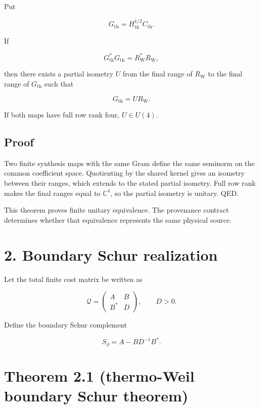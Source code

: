 Put

\[
G_{\mathrm{th}}=H_{\mathrm{th}}^{1/2}C_{\mathrm{th}}.
\]

If

\[
G_{\mathrm{th}}^*G_{\mathrm{th}}=R_{\mathrm W}^*R_{\mathrm W},
\]

then there exists a partial isometry \(U\) from the final range of \(R_{\mathrm W}\) to the final range of \(G_{\mathrm{th}}\) such that

\[
\boxed{G_{\mathrm{th}}=UR_{\mathrm W}.}
\]

If both maps have full row rank four, \(U\in U(4)\).

\hypertarget{proof}{%
\subsection{Proof}\label{proof}}

Two finite synthesis maps with the same Gram define the same seminorm on the common coefficient space. Quotienting by the shared kernel gives an isometry between their ranges, which extends to the stated partial isometry. Full row rank makes the final ranges equal to \(\mathbb C^4\), so the partial isometry is unitary. QED.

This theorem proves finite unitary equivalence. The provenance contract determines whether that equivalence represents the same physical source.

\hypertarget{boundary-schur-realization}{%
\section{2. Boundary Schur realization}\label{boundary-schur-realization}}

Let the total finite cost matrix be written as

\[
\mathcal Q=
\begin{pmatrix}
A&B\\
B^*&D
\end{pmatrix},
\qquad D>0.
\]

Define the boundary Schur complement

\[
\boxed{S_\partial=A-BD^{-1}B^*.}
\]

\hypertarget{theorem-2.1-thermo-weil-boundary-schur-theorem}{%
\section{Theorem 2.1 (thermo-Weil boundary Schur theorem)}\label{theorem-2.1-thermo-weil-boundary-schur-theorem}}

